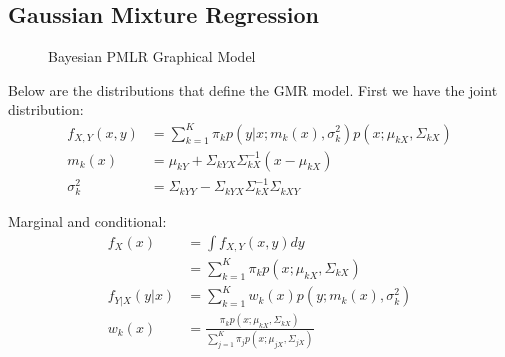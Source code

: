 \documentclass[10pt]{proc}
\begin{document}
\subsection{Gaussian Mixture Regression}

\begin{figure}[th!]
  \centering
  \vspace{2pt}
  \caption{Bayesian PMLR Graphical Model} \label{fig:gmr-pgm}
\end{figure}

Below are the distributions that define the GMR model. First we have the joint
distribution:
%
\begin{align}
    f_{X,Y}(x,y) &= \sum_{k=1}^K
        \pi_k p(y|x; m_k(x), \sigma_k^2) p(x; \mu_{kX}, \Sigma_{kX}) \\
    m_k(x) &= \mu_{kY} + \Sigma_{kYX} \Sigma_{kX}^{-1} (x - \mu_{kX})  \\
    \sigma_k^2 &= \Sigma_{kYY} - \Sigma_{kYX} \Sigma_{kX}^{-1} \Sigma_{kXY}
\end{align}

Marginal and conditional:
%
\begin{align}
    \nonumber
    f_X(x) &= \int f_{X,Y}(x,y) dy \\
           &= \sum_{k=1}^K \pi_k p(x; \mu_{kX}, \Sigma_{kX}) \\
    f_{Y|X}(y|x) &= \sum_{k=1}^K w_k(x) p(y; m_k(x), \sigma_k^2) \\
    w_k(x) &= \frac{ \pi_k p(x; \mu_{kX}, \Sigma_{kX}) }
                   { \sum_{j=1}^K \pi_j p(x; \mu_{jX}, \Sigma_{jX}) }
\end{align}
\end{document}
